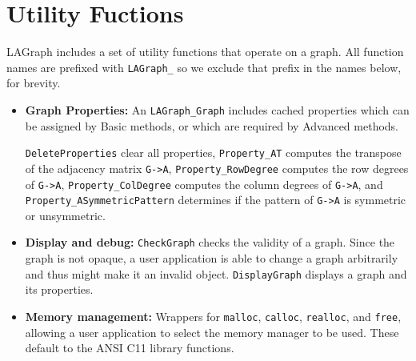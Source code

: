 \section{Utility Fuctions}
\label{sec:utility}

LAGraph includes a set of utility functions that operate
on a graph.  All function names are prefixed with \verb'LAGraph_'
so we exclude that prefix in the names below, for brevity.

\begin{itemize}

\item {\bf Graph Properties:}
    An \verb'LAGraph_Graph' includes cached properties which can be
    assigned by Basic methods, or which are required by Advanced methods.

      \verb'DeleteProperties' clear all properties,
      \verb'Property_AT' computes the transpose of the adjacency matrix \verb'G->A',
      \verb'Property_RowDegree' computes the row degrees of \verb'G->A',
      \verb'Property_ColDegree' computes the column degrees of \verb'G->A',
      and
      \verb'Property_ASymmetricPattern' determines if the pattern of \verb'G->A' is symmetric or unsymmetric.

\item {\bf Display and debug:}
    \verb'CheckGraph' checks the validity of a graph.
    Since the graph is not opaque, a user application is able to change a graph
    arbitrarily and thus might make it an invalid object.
    \verb'DisplayGraph' displays a graph and its properties.

\item {\bf Memory management:}
    Wrappers for \verb'malloc', \verb'calloc', \verb'realloc', and \verb'free',
    allowing a user application to select the memory manager to be used.
    These default to the ANSI C11 library functions.


\end{itemize}
